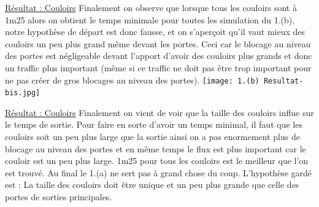 \documentclass[12pt]{article}
\begin{document}
\underline{Résultat : Couloirs}
\newline
Finalement on observe que lorsque tous les couloirs sont à 1m25 alors on obtient le temps minimale pour toutes les simulation du 1.(b), notre hypothèse de départ est donc fausse, et on s'aperçoit qu'il vaut mieux
des couloirs un peu plus grand même devant les portes. Ceci car le blocage au niveau des portes est négligeable devant l'apport d'avoir des couloirs plus grands et donc un traffic plus important (même si ce traffic ne doit
pas être trop important pour ne pas créer de gros blocages au niveau des portes).
\newline
\texttt{[image: 1.(b) Resultat-bis.jpg]}\newline
\newline\newline

\underline{Résultat : Couloirs}
\newline
Finalement on vient de voir que la taille des couloirs influe sur le temps de sortie. Pour faire en sorte d'avoir un temps minimal, il faut que les couloirs soit un peu plus large que la sortie
ainsi on a pas enormement plus de blocage au niveau des portes et en même temps le flux est plus important car le couloir est un peu plus large.
1m25 pour tous les couloirs est le meilleur que l'on est trouvé.
\newline
Au final le 1.(a) ne sert pas à grand chose du coup.
\newline\newline
L'hypothèse gardé est : La taille des couloirs doit être unique et un peu plus grande que celle des portes de sorties principales.
\end{document}
